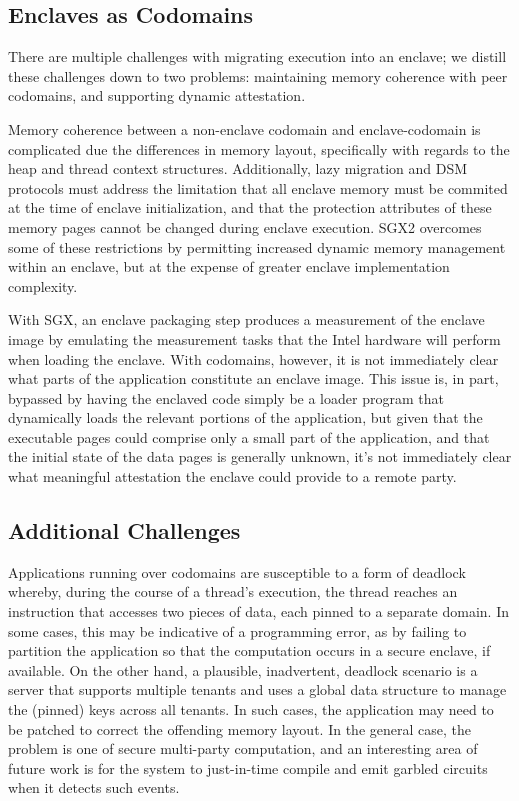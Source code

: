 \subsection{Enclaves as Codomains}
\label{sec:enclaves-as-codomains}

There are multiple challenges with migrating execution into an enclave; we
distill these challenges down to two problems: maintaining memory coherence
with peer codomains, and supporting dynamic attestation.


Memory coherence between a non-enclave codomain and enclave-codomain is
complicated due the differences in memory layout, specifically with regards to
the heap and thread context structures.
%
Additionally, lazy migration and DSM protocols must address the limitation that
all enclave memory must be commited at the time of enclave initialization, and
that the protection attributes of these memory pages cannot be changed during
enclave execution.
%
SGX2 overcomes some of these restrictions by permitting increased dynamic memory
management within an enclave, but at the expense of greater enclave
implementation complexity.
%

With SGX, an enclave packaging step produces a measurement of the enclave image by
emulating the measurement tasks that the Intel hardware will perform when
loading the enclave.
%
With codomains, however, it is not immediately clear what parts of the
application constitute an enclave image.
%
This issue is, in part, bypassed by having the enclaved code simply be a loader
program that dynamically loads the relevant portions of the application, but
given that the executable pages could comprise only a small part of the
application, and that the initial state of the data pages is generally unknown,
it's not immediately clear what meaningful attestation the enclave could
provide to a remote party.


\subsection{Additional Challenges}
\label{sec:codomains-challenges}

%
Applications running over codomains are susceptible to a form of deadlock
whereby, during the course of a thread's execution, the thread reaches an
instruction that accesses two pieces of data, each pinned to a separate domain.
%
In some cases, this may be indicative of a programming error, as by failing to
partition the application so that the computation occurs in a secure enclave,
if available.
%
On the other hand, a plausible, inadvertent, deadlock scenario is a server that
supports multiple tenants and uses a global data structure to manage the
(pinned) keys across all tenants.
%
In such cases, the application may need to be patched to correct the offending
memory layout.
%
In the general case, the problem is one of secure multi-party computation, and
an interesting area of future work is for the system to just-in-time compile
and emit garbled circuits when it detects such events.


